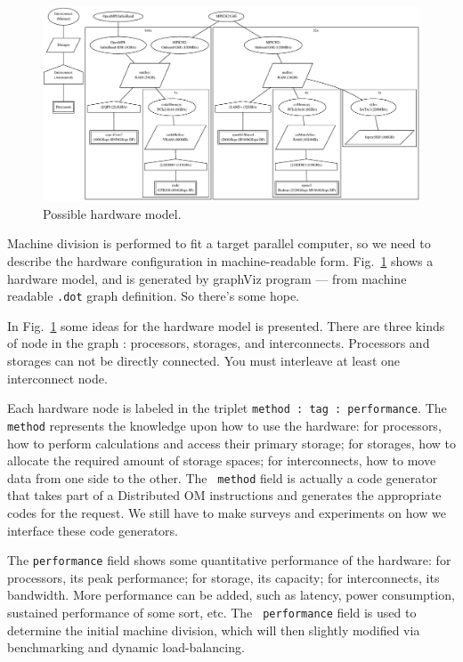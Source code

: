 \documentclass[twocolumn]{article}
\begin{document}
\begin{figure}
  \begin{center}
    \includegraphics[scale=0.3]{figure/hardware_graph.eps}
  \end{center}
  \caption{Possible hardware model.}\label{FigureHardware}
\end{figure}

Machine division is performed to fit a target parallel computer, so we
need to describe the hardware configuration in machine-readable form.
Fig.~\ref{FigureHardware} shows a hardware model, and is generated by
graphViz program --- from machine readable {\tt .dot} graph
definition. So there's some hope. 

In Fig.~\ref{FigureHardware} some ideas for the hardware model is
presented. There are three kinds of node in the graph : processors, storages,
and interconnects. Processors and storages can not be directly connected. You
must interleave at least one interconnect node.

Each hardware node is labeled in the triplet {\tt method : tag :
  performance}. The {\tt method} represents the knowledge upon how to use the
hardware: for processors, how to perform calculations and access their primary
storage; for storages, how to allocate the required amount of storage spaces;
for interconnects, how to move data from one side to the other. The {\tt
  method} field is actually a code generator that takes part of a Distributed
OM instructions and generates the appropriate codes for the request. We still
have to make surveys and experiments on how we interface these code
generators.

The {\tt performance} field shows some quantitative performance of the
hardware: for processors, its peak performance; for storage, its capacity; for
interconnects, its bandwidth. More performance can be added, such as latency,
power consumption, sustained performance of some sort, etc. The {\tt
  performance} field is used to determine the initial machine division, which
will then slightly modified via benchmarking and dynamic load-balancing.
\end{document}
